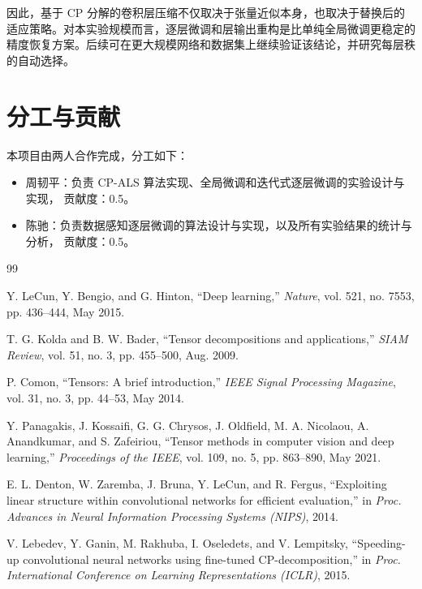 \documentclass[11pt,a4paper,fontset=fandol]{ctexart}
\begin{document}
因此，基于 CP 分解的卷积层压缩不仅取决于张量近似本身，也取决于替换后的适应策略。对本实验规模而言，逐层微调和层输出重构是比单纯全局微调更稳定的精度恢复方案。后续可在更大规模网络和数据集上继续验证该结论，并研究每层秩的自动选择。

\section{分工与贡献}
本项目由两人合作完成，分工如下：
\begin{itemize}
  \item 周韧平：负责 CP-ALS 算法实现、全局微调和迭代式逐层微调的实验设计与实现， 贡献度：0.5。
  \item 陈驰：负责数据感知逐层微调的算法设计与实现，以及所有实验结果的统计与分析， 贡献度：0.5。
\end{itemize}
\begin{thebibliography}{99}

Y. LeCun, Y. Bengio, and G. Hinton, ``Deep learning,'' \emph{Nature}, vol. 521, no. 7553, pp. 436--444, May 2015.

T. G. Kolda and B. W. Bader, ``Tensor decompositions and applications,'' \emph{SIAM Review}, vol. 51, no. 3, pp. 455--500, Aug. 2009.

P. Comon, ``Tensors: A brief introduction,'' \emph{IEEE Signal Processing Magazine}, vol. 31, no. 3, pp. 44--53, May 2014.

Y. Panagakis, J. Kossaifi, G. G. Chrysos, J. Oldfield, M. A. Nicolaou, A. Anandkumar, and S. Zafeiriou, ``Tensor methods in computer vision and deep learning,'' \emph{Proceedings of the IEEE}, vol. 109, no. 5, pp. 863--890, May 2021.

E. L. Denton, W. Zaremba, J. Bruna, Y. LeCun, and R. Fergus, ``Exploiting linear structure within convolutional networks for efficient evaluation,'' in \emph{Proc. Advances in Neural Information Processing Systems (NIPS)}, 2014.

V. Lebedev, Y. Ganin, M. Rakhuba, I. Oseledets, and V. Lempitsky, ``Speeding-up convolutional neural networks using fine-tuned CP-decomposition,'' in \emph{Proc. International Conference on Learning Representations (ICLR)}, 2015.

\end{thebibliography}
\end{document}
